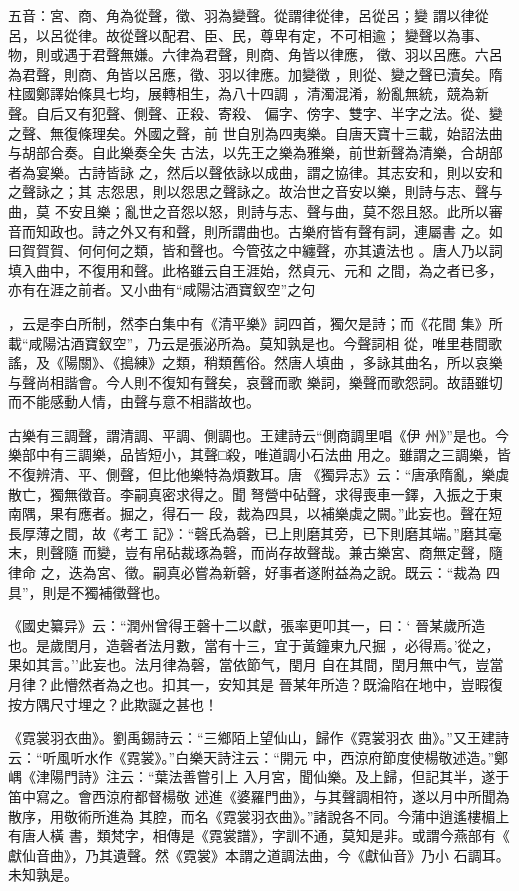 \documentclass{ctexart}
\begin{document}
五音：宮、商、角為從聲，徵、羽為變聲。從謂律從律，呂從呂；變 謂以律從呂，以呂從律。故從聲以配君、臣、民，尊卑有定，不可相逾； 變聲以為事、物，則或遇于君聲無嫌。六律為君聲，則商、角皆以律應， 徵、羽以呂應。六呂為君聲，則商、角皆以呂應，徵、羽以律應。加變徵 ，則從、變之聲已瀆矣。隋柱國鄭譯始條具七均，展轉相生，為八十四調 ，清濁混淆，紛亂無統，競為新聲。自后又有犯聲、側聲、正殺、寄殺、 偏字、傍字、雙字、半字之法。從、變之聲、無復條理矣。外國之聲，前 世自別為四夷樂。自唐天寶十三載，始詔法曲与胡部合奏。自此樂奏全失 古法，以先王之樂為雅樂，前世新聲為清樂，合胡部者為宴樂。古詩皆詠 之，然后以聲依詠以成曲，謂之協律。其志安和，則以安和之聲詠之；其 志怨思，則以怨思之聲詠之。故治世之音安以樂，則詩与志、聲与曲，莫 不安且樂；亂世之音怨以怒，則詩与志、聲与曲，莫不怨且怒。此所以審 音而知政也。詩之外又有和聲，則所謂曲也。古樂府皆有聲有詞，連屬書 之。如曰賀賀賀、何何何之類，皆和聲也。今管弦之中纏聲，亦其遺法也 。唐人乃以詞填入曲中，不復用和聲。此格雖云自王涯始，然貞元、元和 之間，為之者已多，亦有在涯之前者。又小曲有``咸陽沽酒寶釵空''之句

，云是李白所制，然李白集中有《清平樂》詞四首，獨欠是詩；而《花間 集》所載``咸陽沽酒寶釵空''，乃云是張泌所為。莫知孰是也。今聲詞相 從，唯里巷間歌謠，及《陽關》、《搗練》之類，稍類舊俗。然唐人填曲 ，多詠其曲名，所以哀樂与聲尚相諧會。今人則不復知有聲矣，哀聲而歌 樂詞，樂聲而歌怨詞。故語雖切而不能感動人情，由聲与意不相諧故也。

古樂有三調聲，謂清調、平調、側調也。王建詩云``側商調里唱《伊 州》''是也。今樂部中有三調樂，品皆短小，其聲□殺，唯道調小石法曲 用之。雖謂之三調樂，皆不復辨清、平、側聲，但比他樂特為煩數耳。唐 《獨异志》云：``唐承隋亂，樂虡散亡，獨無徵音。李嗣真密求得之。聞 弩營中砧聲，求得喪車一鐸，入振之于東南隅，果有應者。掘之，得石一 段，裁為四具，以補樂虡之闕。''此妄也。聲在短長厚薄之間，故《考工 記》：``磬氏為磬，已上則磨其旁，已下則磨其端。''磨其毫末，則聲隨 而變，豈有帛砧裁琢為磬，而尚存故聲哉。兼古樂宮、商無定聲，隨律命 之，迭為宮、徵。嗣真必嘗為新磬，好事者遂附益為之說。既云：``裁為 四具''，則是不獨補徵聲也。

《國史纂异》云：``潤州曾得王磬十二以獻，張率更叩其一，曰：` 晉某歲所造也。是歲閏月，造磬者法月數，當有十三，宜于黃鐘東九尺掘 ，必得焉。'從之，果如其言。''此妄也。法月律為磬，當依節气，閏月 自在其間，閏月無中气，豈當月律？此懵然者為之也。扣其一，安知其是 晉某年所造？既淪陷在地中，豈暇復按方隅尺寸埋之？此欺誕之甚也！

《霓裳羽衣曲》。劉禹錫詩云：``三鄉陌上望仙山，歸作《霓裳羽衣 曲》。''又王建詩云：``听風听水作《霓裳》。''白樂天詩注云：``開元 中，西涼府節度使楊敬述造。''鄭嵎《津陽門詩》注云：``葉法善嘗引上 入月宮，聞仙樂。及上歸，但記其半，遂于笛中寫之。會西涼府都督楊敬 述進《婆羅門曲》，与其聲調相符，遂以月中所聞為散序，用敬術所進為 其腔，而名《霓裳羽衣曲》。''諸說各不同。今蒲中逍遙樓楣上有唐人橫 書，類梵字，相傳是《霓裳譜》，字訓不通，莫知是非。或謂今燕部有《 獻仙音曲》，乃其遺聲。然《霓裳》本謂之道調法曲，今《獻仙音》乃小 石調耳。未知孰是。
\end{document}
